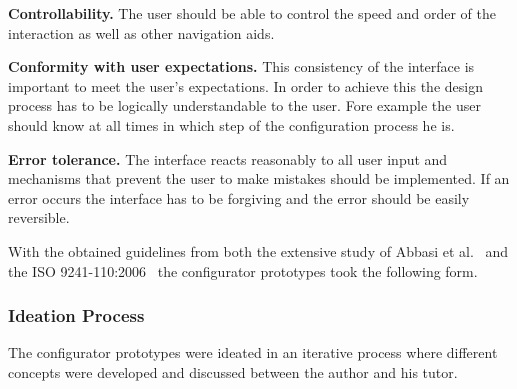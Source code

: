 \documentclass[../medieninformatik-arbeit.tex]{subfiles}
\begin{document}
\textbf{Controllability.} The user should be able to control the speed and order of the interaction as well as other navigation aids.

\textbf{Conformity with user expectations.} This consistency of the interface is important to meet the user's expectations. In order to achieve this the design process has to be logically understandable to the user. Fore example the user should know at all times in which step of the configuration process he is.

\textbf{Error tolerance.} The interface reacts reasonably to all user input and mechanisms that prevent the user to make mistakes should be implemented. If an error occurs the interface has to be forgiving and the error should be easily reversible.

With the obtained guidelines from both the extensive study of Abbasi et al.\ \cite{abbasi2012s} and the ISO 9241-110:2006\ \cite{fdis20069241} the configurator prototypes took the following form.

\subsubsection{Ideation Process}
The configurator prototypes were ideated in an iterative process where different concepts were developed and discussed between the author and his tutor. 
\end{document}

